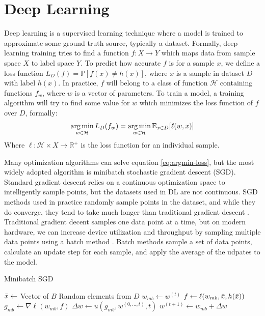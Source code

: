 \section{Deep Learning}
Deep learning is a supervised learning technique where a model is trained to approximate some ground truth source, typically a dataset.
Formally, deep learning training tries to find a function $f: X\longrightarrow Y$ which maps data from sample space $X$ to label space $Y$.
To predict how accurate $f$ is for a sample $x$, we define a loss function $L_D(f)=\mathbb{P}[f(x)\neq h(x)]$, where $x$ is a sample in dataset $D$ with label $h(x)$.
In practice, $f$ will belong to a class of function $\mathcal{H}$ containing functions $f_w$, where $w$ is a vector of parameters.
To train a model, a training algorithm will try to find some value for $w$ which minimizes the loss function of $f$ over $D$, formally:
\begin{equation}
    \operatorname*{arg\,min}_{w\in\mathcal{H}} L_D(f_w) = \operatorname*{arg\,min}_{w\in\mathcal{H}} \mathbb{E}_{x\in D}[\ell (w,x)]
    \label{eq:argmin-loss}
\end{equation} 
Where $\ell:\mathcal{H}\times X\longrightarrow \mathbb{R}^+$ is the loss function for an individual sample. 

Many optimization algorithms can solve equation \ref{eq:argmin-loss}, but the most widely adopted algorithm is minibatch stochastic gradient descent (SGD).
Standard gradient descent relies on a continuous optimization space to intelligently sample points, but the datasets used in DL are not continuous.
SGD methods used in practice randomly sample points in the dataset, and while they do converge, they tend to take much longer than traditional gradient descent \cite{Robbins1951StochasticAproxmethod}.
Traditional gradient decent samples one data point at a time, but on modern hardware, we can increase device utilization and throughput by sampling multiple data points using a batch method \cite{Le2011OnOptMethodsforDL}.
Batch methods sample a set of data points, calculate an update step for each sample, and apply the average of the udpates to the model. 

\begin{algorithm}
    \caption{Minibatch SGD}
    \label{alg:MinibatchSGD}
    \begin{algorithmic}[1]
         
        \State $\Bar{x}\leftarrow$ Vector of $B$ Random elements from $D$ 
        \State $w_{mb}\leftarrow w^{(t)}$ 
        \State $f\leftarrow \ell(w_{mb},\Bar{x},h(\Bar{x}))$ 
        \State $g_{mb}\leftarrow \nabla \ell(w_{mb}, f)$ 
        \State $\Delta w \leftarrow u(g_{mb}, w^{(0,...,t)}, t)$ 
        \State $w^{(t+1)}\leftarrow w_{mb} + \Delta w$ 
        \EndFor
    \end{algorithmic}
\end{algorithm}

